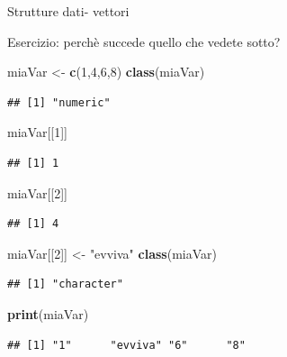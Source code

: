 \documentclass[
  ignorenonframetext,
]{beamer}
\newenvironment{Shaded}{\begin{snugshade}}{\end{snugshade}}
\newcommand{\DecValTok}[1]{\textcolor[rgb]{0.00,0.00,0.81}{#1}}
\newcommand{\FunctionTok}[1]{\textcolor[rgb]{0.13,0.29,0.53}{\textbf{#1}}}
\newcommand{\NormalTok}[1]{#1}
\newcommand{\OtherTok}[1]{\textcolor[rgb]{0.56,0.35,0.01}{#1}}
\newcommand{\StringTok}[1]{\textcolor[rgb]{0.31,0.60,0.02}{#1}}
\begin{document}
\begin{frame}[fragile]{Strutture dati- vettori}
\protect\hypertarget{strutture-dati--vettori}{}
\begin{block}{Esercizio:}
\protect\hypertarget{esercizio-2}{}
perchè succede quello che vedete sotto?

\begin{Shaded}
\begin{Highlighting}[]
\NormalTok{miaVar }\OtherTok{\textless{}{-}} \FunctionTok{c}\NormalTok{(}\DecValTok{1}\NormalTok{,}\DecValTok{4}\NormalTok{,}\DecValTok{6}\NormalTok{,}\DecValTok{8}\NormalTok{)}
\FunctionTok{class}\NormalTok{(miaVar)}
\end{Highlighting}
\end{Shaded}

\begin{verbatim}
## [1] "numeric"
\end{verbatim}

\begin{Shaded}
\begin{Highlighting}[]
\NormalTok{miaVar[[}\DecValTok{1}\NormalTok{]]}
\end{Highlighting}
\end{Shaded}

\begin{verbatim}
## [1] 1
\end{verbatim}

\begin{Shaded}
\begin{Highlighting}[]
\NormalTok{miaVar[[}\DecValTok{2}\NormalTok{]]}
\end{Highlighting}
\end{Shaded}

\begin{verbatim}
## [1] 4
\end{verbatim}

\begin{Shaded}
\begin{Highlighting}[]
\NormalTok{miaVar[[}\DecValTok{2}\NormalTok{]] }\OtherTok{\textless{}{-}} \StringTok{"evviva"}
\FunctionTok{class}\NormalTok{(miaVar)}
\end{Highlighting}
\end{Shaded}

\begin{verbatim}
## [1] "character"
\end{verbatim}

\begin{Shaded}
\begin{Highlighting}[]
\FunctionTok{print}\NormalTok{(miaVar)}
\end{Highlighting}
\end{Shaded}

\begin{verbatim}
## [1] "1"      "evviva" "6"      "8"
\end{verbatim}
\end{block}
\end{frame}
\end{document}
